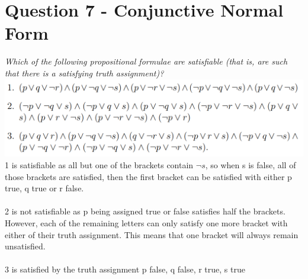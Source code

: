\documentclass{article}[18pt]
\begin{document}
\section{Question 7 - Conjunctive Normal Form}
\textit{Which of the following propositional formulae are satisfiable (that is, are such that there is a satisfying truth assignment)?}
\includegraphics[width=15cm]{Q7.png}\\
1 is satisfiable as all but one of the brackets contain $\lnot s$, so when s is false, all of those brackets are satisfied, then the first bracket can be satisfied with either p true, q true or r false.\\
\\
2 is not satisfiable as p being assigned true or false satisfies half the brackets. However, each of the remaining letters can only satisfy one more bracket with either of their truth assignment. This means that one bracket will always remain unsatisfied.\\
\\
3 is satisfied by the truth assignment p false, q false, r true, s true
\end{document}
